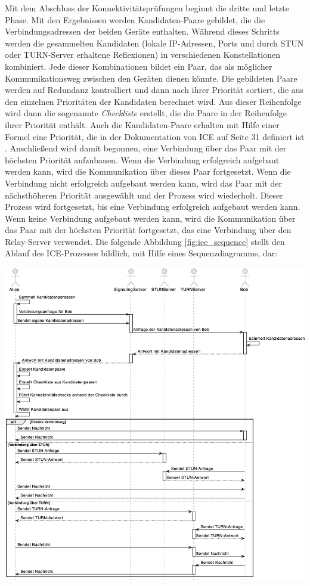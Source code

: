 Mit dem Abschluss der Konnektivitätsprüfungen beginnt die dritte und letzte Phase. Mit den Ergebnissen werden Kandidaten-Paare gebildet, die die Verbindungsadressen der beiden Geräte enthalten. Während dieses Schritts werden die gesammelten Kandidaten (lokale IP-Adressen, Ports und durch STUN oder TURN-Server erhaltene Reflexionen) in verschiedenen Konstellationen kombiniert. Jede dieser Kombinationen bildet ein Paar, das als möglicher Kommunikationsweg zwischen den Geräten dienen könnte. Die gebildeten Paare werden auf Redundanz kontrolliert und dann nach ihrer Priorität sortiert, die aus den einzelnen Prioritäten der Kandidaten berechnet wird. Aus dieser Reihenfolge wird dann die sogenannte \textit{Checkliste} erstellt, die die Paare in der Reihenfolge ihrer Priorität enthält. Auch die Kandidaten-Paare erhalten mit Hilfe einer Formel eine Priorität, die in der Dokumentation von ICE auf Seite 31 definiert ist \parencite[S. 31]{rfc8445_ICE}. Anschließend  wird damit begonnen, eine Verbindung über das Paar mit der höchsten Priorität aufzubauen. Wenn die Verbindung erfolgreich aufgebaut werden kann, wird die Kommunikation über dieses Paar fortgesetzt. Wenn die Verbindung nicht erfolgreich aufgebaut werden kann, wird das Paar mit der nächsthöheren Priorität ausgewählt und der Prozess wird wiederholt. Dieser Prozess wird fortgesetzt, bis eine Verbindung erfolgreich aufgebaut werden kann. Wenn keine Verbindung aufgebaut werden kann, wird die Kommunikation über das Paar mit der höchsten Priorität fortgesetzt, das eine Verbindung über den Relay-Server verwendet. Die folgende Abbildung \ref{fig:ice_sequence} stellt den Ablauf des ICE-Prozesses bildlich, mit Hilfe eines Sequenzdiagramms, dar:

\begin{center}
    \captionsetup{type=figure}
    \includegraphics[width=1.0\linewidth]{images/ice_corrected.jpg}
    \label{fig:ice_sequence}
\end{center}

